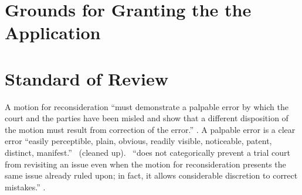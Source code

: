\documentclass[12pt,\documentclassflag]{michiganCourtOfAppealsBrief}
\begin{document}
  
 

  

\section{Grounds for Granting the the Application}


\section{Standard of Review}



A motion for reconsideration ``must demonstrate a palpable error by which the court and the parties have been misled and show that a different disposition of the motion must result from correction of the error.''
\cite{MCL 2.119(F)(3)}.
 A palpable error is a clear error ``easily perceptible, plain, obvious, readily
 visible, noticeable, patent, distinct, manifest.''
 \ (cleaned up).
 \cite[s]{MCL 2.119(F)(3)}\ ``does not categorically prevent a trial court from revisiting an issue even when the motion for reconsideration presents the same issue already ruled upon; in fact, it allows considerable discretion to correct mistakes.''
. 
\end{document}
